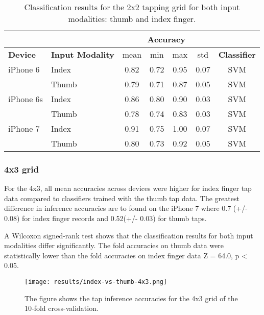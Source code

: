   \begin{table}[h!]
    \centering
  \begin{tabular}{|l|l|c|c|c|c|c|}
    \cline{3-6}
    \multicolumn{2}{c}{} & \multicolumn{4}{|c|}{\textbf{Accuracy}}  \\
    \hline
    \textbf{Device} & \textbf{Input Modality} & mean &   min &   max  & std &  \textbf{Classifier} \\
    \hline
    iPhone 6 & Index &      0.82 &     0.72 &     0.95 &     0.07 &  SVM \\
    & Thumb &      0.79 &     0.71 &     0.87 &     0.05 &  SVM \\
    \hline
  iPhone 6s & Index &      0.86 &     0.80 &     0.90 &     0.03 &  SVM \\
    & Thumb &      0.78 &     0.74 &     0.83 &     0.03 &  SVM \\
    \hline
    iPhone 7 & Index &      0.91 &     0.75 &     1.00 &     0.07 &  SVM \\
    & Thumb &      0.80 &     0.73 &     0.92 &     0.05 &  SVM \\
    \hline
  \end{tabular}
    \caption{Classification results for the 2x2 tapping grid for both input modalities: thumb and index finger.}
  \end{table}
  
  \subsubsection*{4x3 grid}
  For the 4x3, all mean accuracies across devices were higher for index finger tap data compared to classifiers trained with the thumb tap data. The greatest difference in inference accuracies are to found on the iPhone 7 where 0.7 (+/- 0.08) for index finger records and 0.52(+/- 0.03) for thumb taps.
  
  A Wilcoxon signed-rank test shows that the classification results for both input modalities differ significantly. The fold accuracies on thumb data were statistically lower than the fold accuracies on index finger data Z = 64.0, p < 0.05.
  
  
  \begin{figure}[h!]
    \centering
    \texttt{[image: results/index-vs-thumb-4x3.png]}
    \caption{The figure shows the tap inference accuracies for the 4x3 grid of the 10-fold cross-validation.} \label{fig:participation}
  \end{figure}
  
